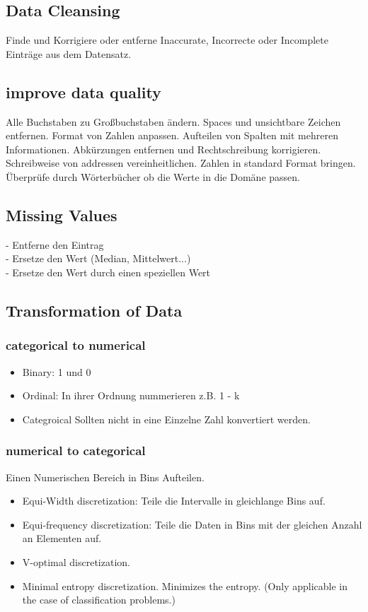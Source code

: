 \documentclass[a4paper]{scrartcl}
\begin{document}
\subsection{Data Cleansing}
Finde und Korrigiere oder entferne Inaccurate, Incorrecte oder Incomplete Einträge aus dem Datensatz.
\subsection{improve data quality}
Alle Buchstaben zu Großbuchstaben ändern. Spaces und unsichtbare Zeichen entfernen. Format von Zahlen anpassen. Aufteilen von Spalten mit mehreren Informationen. Abkürzungen entfernen und Rechtschreibung korrigieren. Schreibweise von addressen vereinheitlichen. Zahlen in standard Format bringen. Überprüfe durch Wörterbücher ob die Werte in die Domäne passen.

\subsection{Missing Values}
- Entferne den Eintrag\\
- Ersetze den Wert (Median, Mittelwert...)\\
- Ersetze den Wert durch einen speziellen Wert\\

\subsection{Transformation of Data}
\subsubsection{categorical to numerical}
\begin{itemize}
\item Binary: 1 und 0
\item Ordinal: In ihrer Ordnung nummerieren z.B. 1 - k
\item Categroical Sollten nicht in eine Einzelne Zahl konvertiert werden.
\end{itemize}
\subsubsection{numerical to categorical}
Einen Numerischen Bereich in Bins Aufteilen.
\begin{itemize}
\item Equi-Width discretization: Teile die Intervalle in gleichlange Bins auf.
\item Equi-frequency discretization: Teile die Daten in Bins mit der gleichen Anzahl an Elementen auf.
\item V-optimal discretization.
\item Minimal entropy discretization. Minimizes the entropy.
(Only applicable in the case of classification problems.)
\end{itemize}
\end{document}
